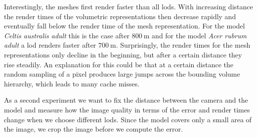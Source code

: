 Interestingly, the meshes first render faster than all \acsp{lod}.
With increasing distance the render times of the volumetric representations then decrease rapidly and eventually fall below the render time of the mesh representation.
For the model \textit{Celtis australis adult} this is the case after $\SI{800}{\m}$ and for the model \textit{Acer rubrum adult} a \ac{lod} renders faster after $\SI{700}{\m}$.
Surprisingly, the render times for the mesh representations only decline in the beginning, but after a certain distance they rise steadily.
An explanation for this could be that at a certain distance the random sampling of a pixel produces large jumps across the bounding volume hierarchy, which leads to many cache misses.


As a second experiment we want to fix the distance between the camera and the model and measure how the image quality in terms of the \FLIP error and render times change when we choose different \acsp{lod}.
Since the model covers only a small area of the image, we crop the image before we compute the \FLIP error.
